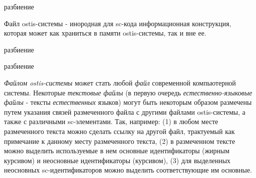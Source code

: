\begin{scnrelfromset}{разбиение}
\end{scnrelfromset}

Файл ostis-системы - инородная для sc-кода информационная конструкция, которая может как храниться в памяти ostis-системы, так и вне ее.

\begin{SCn}

    \begin{scnrelfromset}{разбиение}
    \end{scnrelfromset}
    \begin{scnrelfromset}{разбиение}
            \begin{scnindent}
            \scnidtf{обозначение одного из вхождений (однорго из экземпляров) информационной конструкции]}
            \end{scnindent}
            \begin{scnindent}
            \end{scnindent}
    \end{scnrelfromset}
    \begin{scnindent}
        \begin{scnindent}
        \end{scnindent}
    \end{scnindent}

    \textit{Файлом ostis-системы} может стать любой \textit{файл} современной компьютерной системы.
    Некоторые \textit{текстовые файлы} (в первую очередь \textit{естественно-языковые файлы} - тексты \textit{естественных} языков) могут быть некоторым образом размечены путем указания связей размеченного файла с другими файлами ostis-системы, а также с различными sc-элементами.
    Так, например: (1) в любом месте размеченного текста можно сделать ссылку на другой файл, трактуемый как примечание к данному месту размеченного текста, (2) в размеченном тексте можно выделить используемые в нем основные идентификаторы (жирным курсивом) и неосновные идентификаторы (курсивом), (3) для выделенных неосновных sc-идентификаторов можно выделить соответствующие им основные.


\end{SCn}
